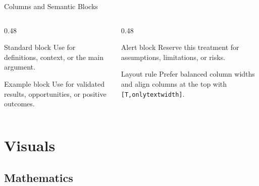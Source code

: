 \documentclass[10pt,aspectratio=169]{virgiling-slides}
\begin{document}
\begin{frame}{Columns and Semantic Blocks}
  \begin{columns}[T,onlytextwidth]
    \begin{column}{0.48\textwidth}
      \begin{block}{Standard block}
        Use for definitions, context, or the main argument.
      \end{block}

      \begin{exampleblock}{Example block}
        Use for validated results, opportunities, or positive outcomes.
      \end{exampleblock}
    \end{column}
    \begin{column}{0.48\textwidth}
      \begin{alertblock}{Alert block}
        Reserve this treatment for assumptions, limitations, or risks.
      \end{alertblock}

      \begin{block}{Layout rule}
        Prefer balanced column widths and align columns at the top with
        \texttt{[T,onlytextwidth]}.
      \end{block}
    \end{column}
  \end{columns}
\end{frame}

\section{Visuals}

\subsection{Mathematics}
\end{document}
